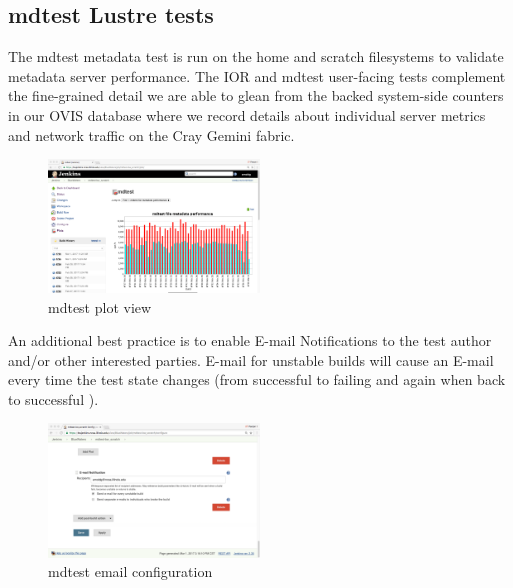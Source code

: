 \documentclass[10pt, conference, compsocconf]{IEEEtran}
\begin{document}
\subsection{mdtest Lustre tests}
The mdtest metadata test is run on the home and scratch filesystems to validate metadata server performance.  The IOR and mdtest user-facing tests complement the fine-grained detail we are able to glean from the backed system-side counters in our OVIS database where we record details about individual server metrics and network traffic on the Cray Gemini fabric.  
\begin{figure}[H]
\centering
\includegraphics[width=0.5\textwidth]{mdtest-plot}
\caption{ mdtest plot view }
\label{fig:mdtest-plot}
\end{figure}

An additional best practice is to enable E-mail Notifications to the test author and/or other interested parties.  E-mail for unstable builds will cause an E-mail every time the test state changes (from successful to failing and again when back to successful ).
\begin{figure}[H]
\centering
\includegraphics[width=0.5\textwidth]{mdtest-config-email}
\caption{ mdtest email configuration }
\label{fig:mdtest-config-email}
\end{figure}
\end{document}
